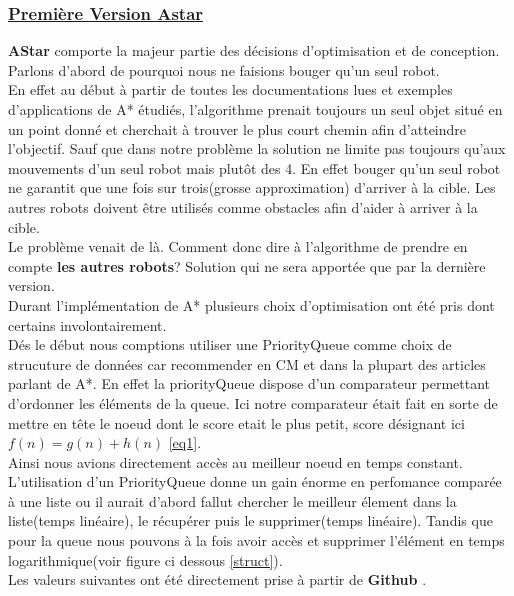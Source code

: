 \documentclass[12pt]{article}
\begin{document}
	\subsubsection{\underline{Première Version Astar}}
	\textbf{AStar} comporte la majeur partie des décisions d'optimisation et de conception. \\
	Parlons d'abord de pourquoi nous ne faisions bouger qu'un seul robot.\\
	En effet au début à partir de toutes les documentations lues et exemples d'applications de A* étudiés, l'algorithme prenait toujours un seul
	objet situé en un point donné et cherchait à trouver le plus court chemin afin d'atteindre l'objectif. Sauf que dans notre problème
	la solution ne limite pas toujours qu'aux mouvements d'un seul robot mais plutôt des 4. En effet bouger qu'un seul robot ne garantit que une 
	fois sur trois(grosse approximation) d'arriver à la cible. Les autres robots doivent être utilisés comme obstacles afin d'aider à arriver à
	la cible.\\
	Le problème venait de là. Comment donc dire à l'algorithme de prendre en compte \textbf{les autres robots}? Solution qui ne sera apportée que par
	la dernière version.\\
	Durant l'implémentation de A* plusieurs choix d'optimisation ont été pris dont certains involontairement.\\
	Dés le début nous comptions utiliser une PriorityQueue comme choix de strucuture de données car recommender en CM et dans la plupart des articles parlant de A*.
	En effet la priorityQueue dispose d'un comparateur permettant d'ordonner les éléments de la queue. Ici notre comparateur
	était fait en sorte de mettre en tête le noeud dont le score etait le plus petit, score désignant ici $f(n) = g(n) + h(n)$ \ref{eq1}.\\
	Ainsi nous avions directement accès au meilleur noeud en temps constant. L'utilisation d'un PriorityQueue donne un gain énorme en perfomance
	comparée à une liste ou il aurait d'abord fallut chercher le meilleur élement dans la liste(temps linéaire), le récupérer puis le supprimer(temps linéaire). Tandis que pour la
	queue nous pouvons à la fois avoir accès et supprimer l'élément en temps logarithmique(voir figure ci dessous \ref{struct}).\\
	Les valeurs suivantes ont été directement prise à partir de \textbf{Github} \cite{bigO}.
\end{document}

